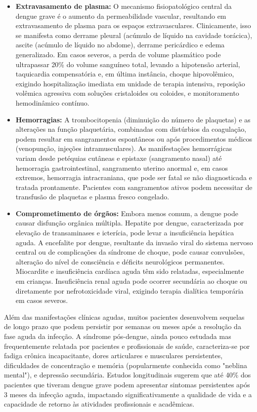 \begin{itemize}
    \item \textbf{Extravasamento de plasma:} O mecanismo fisiopatológico central da dengue grave é o aumento da permeabilidade vascular, resultando em extravasamento de plasma para os espaços extravasculares. Clinicamente, isso se manifesta como derrame pleural (acúmulo de líquido na cavidade torácica), ascite (acúmulo de líquido no abdome), derrame pericárdico e edema generalizado. Em casos severos, a perda de volume plasmático pode ultrapassar 20\% do volume sanguíneo total, levando a hipotensão arterial, taquicardia compensatória e, em última instância, choque hipovolêmico, exigindo hospitalização imediata em unidade de terapia intensiva, reposição volêmica agressiva com soluções cristaloides ou coloides, e monitoramento hemodinâmico contínuo.
    
    \item \textbf{Hemorragias:} A trombocitopenia (diminuição do número de plaquetas) e as alterações na função plaquetária, combinadas com distúrbios da coagulação, podem resultar em sangramentos espontâneos ou após procedimentos médicos (venopunção, injeções intramusculares). As manifestações hemorrágicas variam desde petéquias cutâneas e epistaxe (sangramento nasal) até hemorragia gastrointestinal, sangramento uterino anormal e, em casos extremos, hemorragia intracraniana, que pode ser fatal se não diagnosticada e tratada prontamente. Pacientes com sangramentos ativos podem necessitar de transfusão de plaquetas e plasma fresco congelado.
    
    \item \textbf{Comprometimento de órgãos:} Embora menos comum, a dengue pode causar disfunção orgânica múltipla. Hepatite por dengue, caracterizada por elevação de transaminases e icterícia, pode levar a insuficiência hepática aguda. A encefalite por dengue, resultante da invasão viral do sistema nervoso central ou de complicações da síndrome de choque, pode causar convulsões, alteração do nível de consciência e déficits neurológicos permanentes. Miocardite e insuficiência cardíaca aguda têm sido relatadas, especialmente em crianças. Insuficiência renal aguda pode ocorrer secundária ao choque ou diretamente por nefrotoxicidade viral, exigindo terapia dialítica temporária em casos severos.
\end{itemize}

Além das manifestações clínicas agudas, muitos pacientes desenvolvem sequelas de longo prazo que podem persistir por semanas ou meses após a resolução da fase aguda da infecção. A síndrome pós-dengue, ainda pouco estudada mas frequentemente relatada por pacientes e profissionais de saúde, caracteriza-se por fadiga crônica incapacitante, dores articulares e musculares persistentes, dificuldades de concentração e memória (popularmente conhecida como "neblina mental"), e depressão secundária. Estudos longitudinais sugerem que até 40\% dos pacientes que tiveram dengue grave podem apresentar sintomas persistentes após 3 meses da infecção aguda, impactando significativamente a qualidade de vida e a capacidade de retorno às atividades profissionais e acadêmicas.

